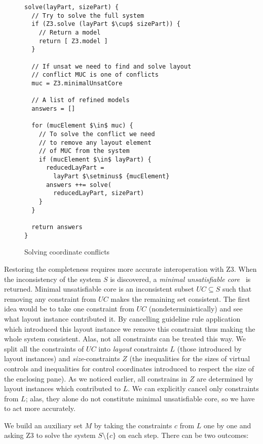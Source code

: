 \begin{figure}
\begin{lstlisting}[language=algo,mathescape=true,basicstyle=\ttfamily]
solve(layPart, sizePart) {
  // Try to solve the full system
  if (Z3.solve (layPart $\cup$ sizePart)) {
    // Return a model
    return [ Z3.model ]
  }

  // If unsat we need to find and solve layout
  // conflict MUC is one of conflicts
  muc = Z3.minimalUnsatCore

  // A list of refined models
  answers = []

  for (mucElement $\in$ muc) {
    // To solve the conflict we need
    // to remove any layout element
    // of MUC from the system
    if (mucElement $\in$ layPart) {
      reducedLayPart =
        layPart $\setminus$ {mucElement}
      answers ++= solve(
        reducedLayPart, sizePart)
    }
  }

  return answers
}
\end{lstlisting}
\caption{Solving coordinate conflicts}
\label{Z3op}
\end{figure}

Restoring the completeness requires more accurate interoperation with \textsc{Z3}. When the inconsistency of the system
$S$ is discovered, a \emph{minimal unsatisfiable core}~\cite{minUnsatCore} is returned.
Minimal unsatisfiable core is an inconsistent subset $UC\subseteq S$ such that removing any constraint from $UC$
makes the remaining set consistent. The first idea would be to take one constraint from $UC$ (nondeterministically) and
see what layout instance contributed it. By cancelling guideline rule application which introduced this
layout instance we remove this constraint thus making the whole system consistent. Alas, not all constraints can
be treated this way. We split all the constraints of $UC$ into \emph{layout} constraints $L$ (those
introduced by layout instances) and \emph{size}-constraints $Z$ (the inequalities for the sizes of virtual controls and
inequalities for control coordinates introduced to respect the size of the enclosing pane). As we noticed earlier,
all constrains in $Z$ are determined by layout instances which contributed to $L$. We can explicitly cancel only
constraints from $L$; alas, they alone do not constitute minimal unsatisfiable core, so we have to act more accurately.

We build an auxiliary set $M$ by taking the constraints $c$ from $L$ one by one and asking \textsc{Z3} to solve the system $S\setminus\{c\}$ on each step.
There can be two outcomes:

